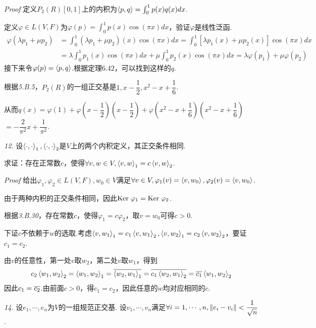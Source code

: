 \textit{Proof}
定义\(P_2(R)[0,1]\)上的内积为\(\left\langle p,q \right\rangle=\int_{0}^{1} p(x)q(x)dx\).

定义\(\varphi \in L(V,F)\)为\(\varphi(p)=\int_{0}^{1} p(x)\cos(\pi x)dx\)，验证\(\varphi\)是线性泛函.
    \begin{align*}
        \varphi(\lambda p_1+\mu p_2)&=\int_{0}^{1} (\lambda p_1+\mu p_2)(x)\cos(\pi x)dx
        =\int_{0}^{1} [\lambda p_1(x)+\mu p_2(x)]\cos(\pi x)dx \\
        &=\lambda \int_{0}^{1}p_1(x)\cos(\pi x)dx+\mu \int_{0}^{1}p_2(x)\cos(\pi x)dx
        =\lambda \varphi(p_1)+\mu \varphi(p_2)
    \end{align*}
接下来令\(\varphi(p)=\left\langle p,q \right\rangle\).根据定理6.42，可以找到这样的\(q\).

根据\textit{5.B.5}，\(P_2(R)\)的一组正交基是\(1,x-\dfrac{1}{2},x^2-x+\dfrac{1}{6}\).

从而\(q(x)=\varphi(1)+\varphi(x-\dfrac{1}{2})(x-\dfrac{1}{2})+\varphi(x^2-x+\dfrac{1}{6})(x^2-x+\dfrac{1}{6})\)
\(=-\dfrac{2}{\pi^2}x+\dfrac{1}{\pi^2}\).

\hspace*{\fill}

\textit{12.}
设\(\left\langle \cdot,\cdot \right\rangle_1,\left\langle \cdot,\cdot \right\rangle_2\)是\(V\)上的两个内积定义，其正交条件相同.

求证：存在正常数\(c\)，使得\(\forall v,w \in V,\left\langle v,w \right\rangle_1=c\left\langle v,w \right\rangle_2\).

\textit{Proof}
给出\(\varphi_1,\varphi_2 \in L(V,F),w_0 \in V\)满足\(\forall v \in V,\varphi_1(v)=\left\langle v,w_0 \right\rangle,\varphi_2(v)=\left\langle v,w_0 \right\rangle\).

由于两种内积的正交条件相同，因此\(\mathrm{Ker \;} \varphi_1=\mathrm{Ker \;} \varphi_2\).

根据\textit{3.B.30}，存在常数\(c\)，使得\(\varphi_1=c\varphi_2\)，取\(v=w_0\)可得\(c>0\).

下证\(c\)不依赖于\(w\)的选取.考虑\(\left\langle v,w_1 \right\rangle_1=c_1\left\langle v,w_1 \right\rangle_2,\left\langle v,w_2 \right\rangle_1=c_2\left\langle v,w_2 \right\rangle_2\)，要证\(c_1=c_2\).

由\(v\)的任意性，第一处\(v\)取\(w_2\)，第二处\(v\)取\(w_1\)，得到
    \begin{align*}
        c_2\left\langle w_1,w_2 \right\rangle_2=\left\langle w_1,w_2 \right\rangle_1=\overline{\left\langle w_2,w_1 \right\rangle_1}
        =\overline{c_1\left\langle w_2,w_1 \right\rangle_2}=\overline{c_1}\left\langle w_1,w_2 \right\rangle_2
    \end{align*}
因此\(c_1=\overline{c_2}\).由前面\(c>0\)，得\(c_1=c_2\)，因此任意的\(w\)均对应相同的\(c\).

\hspace*{\fill}

\textit{14.}
设\(e_1,\cdots,e_n\)为\(V\)的一组规范正交基.
设\(v_1,\cdots,v_n\)满足\(\forall i=1,\cdots,n,\left\lVert e_i-v_i \right\rVert<\dfrac{1}{\sqrt{n}}\).

